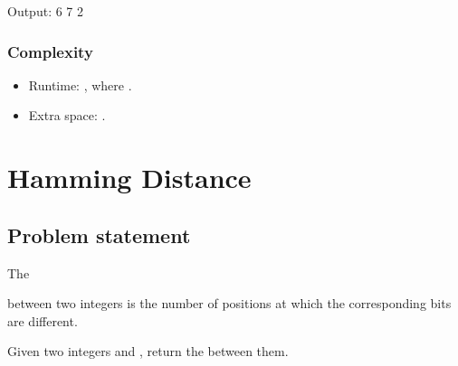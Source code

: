 \documentclass[letterpaper,12pt,english]{book}
\begin{document}
\begin{sphinxVerbatim}[commandchars=\\\{\}]
Output:
6
7
2
\end{sphinxVerbatim}


\subsubsection{Complexity}
\label{\detokenize{Mathematics/09_MTH_376_Wiggle_Subsequence:complexity}}\begin{itemize}
\item {} 
\sphinxAtStartPar
Runtime: , where .

\item {} 
\sphinxAtStartPar
Extra space: .

\end{itemize}

\sphinxstepscope


\section{Hamming Distance}
\label{\detokenize{Mathematics/09_MTH_461_Hamming_Distance:hamming-distance}}\label{\detokenize{Mathematics/09_MTH_461_Hamming_Distance::doc}}

\subsection{Problem statement\sphinxfootnotemark[127]}
\label{\detokenize{Mathematics/09_MTH_461_Hamming_Distance:problem-statement}}%
\begin{footnotetext}[127]\sphinxAtStartFootnote
{}
%
\end{footnotetext}\ignorespaces 
\sphinxAtStartPar
The %
\begin{footnote}[128]\sphinxAtStartFootnote
{}
%
\end{footnote} between two integers is the number of positions at which the corresponding bits are different.

\sphinxAtStartPar
Given two integers  and , return the  between them.
\end{document}
